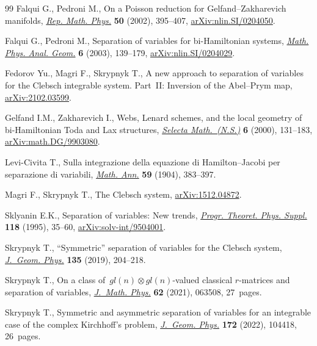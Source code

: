 \documentclass[pdftex]{sigma}
\numberwithin{equation}{section}
\begin{document}
\begin{thebibliography}{99}
Falqui G., Pedroni M., On a {P}oisson reduction for {G}elfand--{Z}akharevich
 manifolds, \href{https://doi.org/10.1016/S0034-4877(02)80068-4}{\textit{Rep.
 Math. Phys.}} \textbf{50} (2002), 395--407,
 \href{http://arxiv.org/abs/nlin.SI/0204050}{arXiv:nlin.SI/0204050}.

Falqui G., Pedroni M., Separation of variables for bi-{H}amiltonian systems,
 \href{https://doi.org/10.1023/A:1024080315471}{\textit{Math. Phys. Anal.
 Geom.}} \textbf{6} (2003), 139--179,
 \href{http://arxiv.org/abs/nlin.SI/0204029}{arXiv:nlin.SI/0204029}.

Fedorov Yu., Magri F., Skrypnyk T., A new approach to separation of variables
 for the {C}lebsch integrable system. Part~{II}: {I}nversion of the
 {A}bel--{P}rym map, \href{http://arxiv.org/abs/2102.03599}{arXiv:2102.03599}.

Gelfand I.M., Zakharevich I., Webs, {L}enard schemes, and the local geometry of
 bi-{H}amiltonian {T}oda and {L}ax structures,
 \href{https://doi.org/10.1007/PL00001387}{\textit{Selecta Math.~(N.S.)}}
 \textbf{6} (2000), 131--183,
 \href{http://arxiv.org/abs/math.DG/9903080}{arXiv:math.DG/9903080}.

Levi-Civita T., Sulla integrazione della equazione di {H}amilton--{J}acobi per
 separazione di variabili,
 \href{https://doi.org/10.1007/BF01445149}{\textit{Math. Ann.}} \textbf{59}
 (1904), 383--397.

Magri F., Skrypnyk T., The {C}lebsch system,
 \href{http://arxiv.org/abs/1512.04872}{arXiv:1512.04872}.

Sklyanin E.K., Separation of variables: {N}ew trends,
 \href{https://doi.org/10.1143/PTPS.118.35}{\textit{Progr. Theoret. Phys.
 Suppl.}} \textbf{118} (1995), 35--60,
 \href{http://arxiv.org/abs/solv-int/9504001}{arXiv:solv-int/9504001}.

Skrypnyk T., ``{S}ymmetric'' separation of variables for the {C}lebsch system,
 \href{https://doi.org/10.1016/j.geomphys.2018.09.014}{\textit{J.~Geom.
 Phys.}} \textbf{135} (2019), 204--218.

Skrypnyk T., On a class of~{$gl(n)\otimes gl(n)$}-valued classical
 {$r$}-matrices and separation of variables,
 \href{https://doi.org/10.1063/5.0041967}{\textit{J.~Math. Phys.}} \textbf{62}
 (2021), 063508, 27~pages.

Skrypnyk T., Symmetric and asymmetric separation of variables for an integrable
 case of the complex {K}irchhoff's problem,
 \href{https://doi.org/10.1016/j.geomphys.2021.104418}{\textit{J.~Geom.
 Phys.}} \textbf{172} (2022), 104418, 26~pages.


\end{thebibliography}
\end{document}
